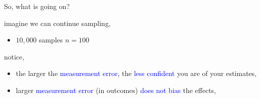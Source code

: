 \begin{lhframe}[rhgraphic={\texttt{[image: descendant4\_samplesize.pdf]}}]
	{So, what is going on?}
	
	imagine we can continue sampling,
	\begin{itemize}
		\item $10,000$ samples $n=100$
	\end{itemize}
	
	notice,
	\begin{itemize}
		\item the larger the \textcolor{blue}{measurement error}, the \textcolor{blue}{less confident} you are of your estimates,
		\item larger \textcolor{blue}{measurement error} (in outcomes) \textcolor{blue}{does not bias} the effects, 
	\end{itemize}
\end{lhframe}
%
%
